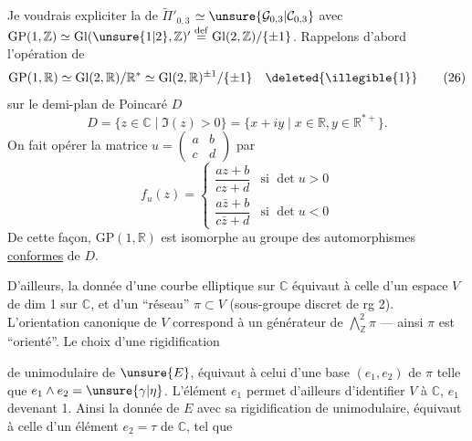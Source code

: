
Je voudrais  expliciter la  de
$\widetilde{\Pi}'_{0,3}$ 
$\simeq\unsure{\mathcal G_{0,3}|\mathcal C_{0,3}}$ 
avec $\mathrm{GP}(1,\mathbb Z)\simeq\mathrm{Gl}(\unsure{1|2},\mathbb Z)'\overset{\mathrm{def}}{=}\mathrm{Gl}(2,\mathbb Z)/\{\pm1\}$.
Rappelons d'abord l'opération de
\[
\mathrm{GP}(1,\mathbb R)\simeq\mathrm{Gl}(2,\mathbb R)/\mathbb R^*
\simeq\mathrm{Gl}(2,\mathbb R)^{\pm1}/\{\pm1\}\quad\deleted{\illegible{1}}
\tag{26}
\]
sur le demi-plan de Poincaré $D$
\[
D=\{z\in\mathbb C\mid\Im(z)>0\}=\{x+iy\mid x\in\mathbb R,y\in\mathbb R^{*+}\}.
\tag{27}
\]
On fait opérer la matrice $u=\begin{pmatrix}a&b\\c&d\end{pmatrix}$ par
\[
f_u(z)=\left\{\begin{array}{ll}
\dfrac{az+b}{cz+d}&\text{si }\det u>0\\[4pt]
\dfrac{a\bar z+b}{c\bar z+d}&\text{si }\det u<0
\end{array}\right.
\tag{28}
\]
De cette façon, $\mathrm{GP}(1,\mathbb R)$ est isomorphe au groupe des automorphismes \uline{conformes} de $D$.


D'ailleurs, la donnée d'une courbe elliptique  sur $\mathbb C$ équivaut à celle d'un espace $V$ de dim 1 sur $\mathbb C$, et d'un ``réseau'' $\pi\subset V$ (sous-groupe discret de rg 2).
L'orientation canonique de $V$ correspond à un générateur \unsure{$\gamma|\eta$} de $\bigwedge^2_{\mathbb Z}\pi$ --- ainsi $\pi$ est ``orienté''. Le choix d'une rigidification


de  unimodulaire de $\unsure{E}$, équivaut à celui d'une base $(e_1,e_2)$ de $\pi$  telle que $e_1\wedge e_2=\unsure{\gamma|\eta}$. L'élément $e_1$  permet d'ailleurs d'identifier $V$ à $\mathbb C$, $e_1$ devenant 1. Ainsi la donnée de $E$ avec sa rigidification de  unimodulaire, équivaut à celle d'un élément $e_2=\tau$ de $\mathbb C$, tel que

